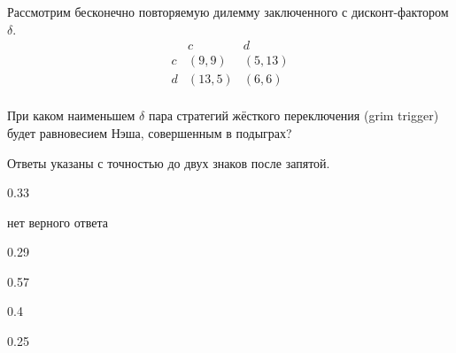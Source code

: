 
\begin{question}
Рассмотрим бесконечно повторяемую дилемму заключенного с
дисконт-фактором \(\delta\). \[
\begin{matrix}
   & c & d \\
c  & (9, 9) & (5, 13) \\
d  & (13, 5) & (6, 6) \\
\end{matrix}
\]

При каком наименьшем \(\delta\) пара стратегий жёсткого переключения
(grim trigger) будет равновесием Нэша, совершенным в подыграх?

Ответы указаны с точностью до двух знаков после запятой.
\begin{answerlist}
  \item 0.33
  \item нет верного ответа
  \item 0.29
  \item 0.57
  \item 0.4
  \item 0.25
\end{answerlist}
\end{question}


